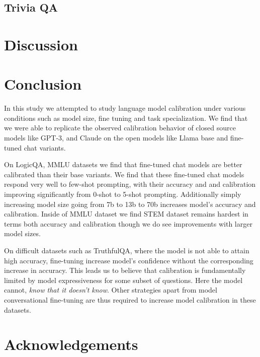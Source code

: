 \documentclass[11pt]{article}
\begin{document}
\subsection{Trivia QA}


\section{Discussion}


\section{Conclusion}

In this study we attempted to study language model calibration  under various conditions such as model size, fine tuning and task specialization. We find that we were able to replicate the observed  calibration behavior of closed source models like 
GPT-3, and  Claude on the open models like Llama base and fine-tuned chat variants. 

On LogicQA, MMLU datasets we find that fine-tuned chat models are better calibrated than their base variants.
We find that these fine-tuned chat models respond very well to few-shot prompting, with their accuracy and and calibration improving significantly from 0-shot to 5-shot prompting. Additionally simply increasing 
model size going from 7b to 13b to 70b increases model's accuracy and calibration. Inside of MMLU dataset we find  STEM dataset remains hardest in terms both accuracy and calibration though we do see improvements with larger model sizes.

On difficult datasets such as TruthfulQA, where the 
model is not able to attain high accuracy, fine-tuning 
increase model's confidence without the corresponding 
increase in accuracy. This leads us to believe that 
calibration is fundamentally limited by model 
expressiveness for some subset of questions. Here 
the model cannot, \emph{know that it doesn't know}. Other strategies apart from model conversational 
fine-tuning are thus required to increase model calibration in these datasets.

\section{Acknowledgements}
\end{document}
